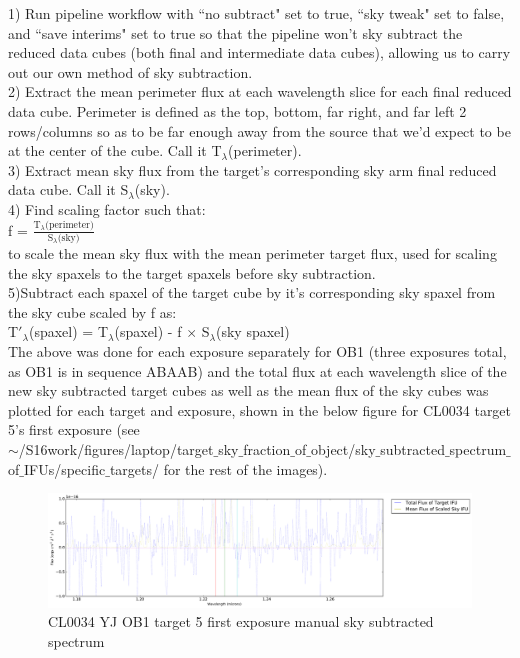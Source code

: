 \documentclass[10pt,letterpaper]{article}
\begin{document}
1) Run pipeline workflow with ``no subtract" set to true, ``sky tweak" set to false, and ``save interims" set to true so that the pipeline won't sky subtract the reduced data cubes (both final and intermediate data cubes), allowing us to carry out our own method of sky subtraction.\\

2) Extract the mean perimeter flux at each wavelength slice for each final reduced data cube. Perimeter is defined as the top, bottom, far right, and far left 2 rows/columns so as to be far enough away from the source that we'd expect to be at the center of the cube. Call it T$_{\lambda}$(perimeter).\\

3) Extract mean sky flux from the target's corresponding sky arm final reduced data cube. Call it S$_{\lambda}$(sky).\\

4) Find scaling factor such that:\\
f = $\frac{\text{T}_{\lambda}\text{(perimeter)}}{\text{S}_{\lambda}\text{(sky)}}$\\
to scale the mean sky flux with the mean perimeter target flux, used for scaling the sky spaxels to the target spaxels before sky subtraction.\\

5)Subtract each spaxel of the target cube by it's corresponding sky spaxel from the sky cube scaled by f as:\\
T$\prime _{\lambda}$(spaxel) = T$_{\lambda}$(spaxel) - f $\times$ S$_{\lambda}$(sky spaxel)\\

The above was done for each exposure separately for OB1 (three exposures total, as OB1 is in sequence ABAAB) and the total flux at each wavelength slice of the new sky subtracted target cubes as well as the mean flux of the sky cubes was plotted for each target and exposure, shown in the below figure for CL0034 target 5's first exposure (see \\$\sim$/S16work/figures/laptop/target$\_$sky$\_$fraction$\_$of$\_$object/sky$\_$subtracted$\_$spectrum$\_$of$\_$IFUs/specific$\_$targets/ for the rest of the images).\\

\begin{figure}[h!]
\caption{CL0034 YJ OB1 target 5 first exposure manual sky subtracted spectrum}\label{fig:CL0034 YJ OB1 target 5 first exposure manual sky subtracted spectrum}
\includegraphics[scale=0.4]{figures/CL0034-YJ-OB-1_2014-07-11Tfirst_exposure_Target_5.pdf}
\end{figure}
\end{document}
